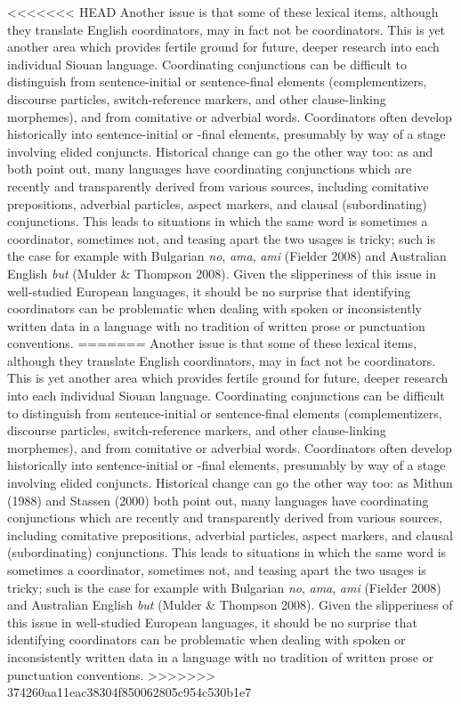 \documentclass[output=paper]{LSP/langsci}
\begin{document}
<<<<<<< HEAD
Another issue is that some of these lexical items, although they translate English coordinators, may in fact not be coordinators. This is yet another area which provides fertile ground for future, deeper research into each individual Siouan language. Coordinating conjunctions can be difficult to distinguish from sentence-initial or sentence-final elements (complementizers, discourse particles, switch-reference markers, and other clause-linking morphemes), and from comitative or adverbial words. Coordinators often develop historically into sentence-initial or -final elements, presumably by way of a stage involving elided conjuncts. Historical change can go the other way too: as \citet{Mithun1988} and \citet{Stassen2000} both point out, many languages have coordinating conjunctions which are recently and transparently derived from various sources, including comitative prepositions, adverbial particles, aspect markers, and clausal (subordinating) conjunctions. This leads to situations in which the same word is sometimes a coordinator, sometimes not, and teasing apart the two usages is tricky; such is the case for example with Bulgarian \textit{no}, \textit{ama}, \textit{ami} (Fielder 2008) and Australian English \textit{but} (Mulder \& Thompson 2008). Given the slipperiness of this issue in well-studied European languages, it should be no surprise that identifying coordinators can be problematic when dealing with spoken or inconsistently written data in a language with no tradition of written prose or punctuation conventions.
=======
Another issue is that some of these lexical items, although they translate English coordinators, may in fact not be coordinators. This is yet another area which provides fertile ground for future, deeper research into each individual Siouan language. Coordinating conjunctions can be difficult to distinguish from sentence-initial or sentence-final elements (complementizers, discourse particles, switch-reference markers, and other clause-linking morphemes), and from comitative or adverbial words. Coordinators often develop historically into sentence-initial or -final elements, presumably by way of a stage involving elided conjuncts. Historical change can go the other way too: as Mithun (1988) and Stassen (2000) both point out, many languages have coordinating conjunctions which are recently and transparently derived from various sources, including comitative prepositions, adverbial particles, aspect markers, and clausal (subordinating) conjunctions. This leads to situations in which the same word is sometimes a coordinator, sometimes not, and teasing apart the two usages is tricky; such is the case for example with Bulgarian \textit{no}, \textit{ama}, \textit{ami} (Fielder 2008) and Australian English \textit{but} (Mulder \& Thompson 2008). Given the slipperiness of this issue in well-studied European languages, it should be no surprise that identifying coordinators can be problematic when dealing with spoken or inconsistently written data in a language with no tradition of written prose or punctuation conventions.
>>>>>>> 374260aa11eac38304f850062805c954c530b1e7
\end{document}
